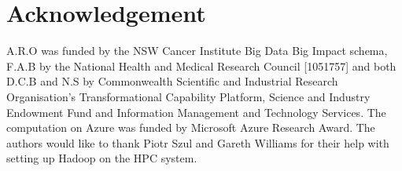 \documentclass{bioinfo}
\begin{document}
\section*{Acknowledgement}
A.R.O was funded by the NSW Cancer Institute Big Data Big Impact schema, F.A.B by the National Health and Medical Research Council [1051757] and both D.C.B and N.S by Commonwealth Scientific and Industrial Research Organisation's Transformational Capability Platform, Science and Industry Endowment Fund and Information Management and Technology Services. The computation on Azure was funded by Microsoft Azure Research Award. 
The authors would like to thank Piotr Szul and Gareth Williams for their help with setting up Hadoop on the HPC system.


%
%
%
%
  
\end{document}
